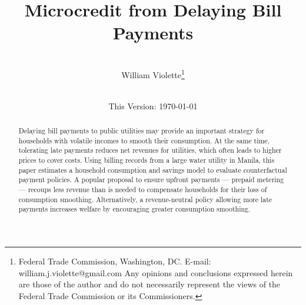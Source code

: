 \documentclass[12pt,table]{article}
\begin{document}
\begin{titlepage} 
\title{Microcredit from Delaying Bill Payments}
\author{\\[3em]
  William Violette\thanks{Federal Trade Commission, Washington, DC. E-mail: william.j.violette@gmail.com   Any opinions and conclusions expressed herein are those of the author and do not necessarily represent the views of the Federal Trade Commission or its Commissioners.} \\
 \\ 
  }
\vspace{30mm}
\date{\vspace{5mm}This Version: \today}
\maketitle
\begin{abstract}
Delaying bill payments to public utilities may provide an important strategy for households with volatile incomes to smooth their consumption.  At the same time, tolerating late payments reduces net revenues for utilities, which often leads to higher prices to cover costs.  Using billing records from a large water utility in Manila, this paper estimates a household consumption and savings model to evaluate counterfactual payment policies.  A popular proposal to ensure upfront payments --- prepaid metering --- recoups less revenue than is needed to compensate households for their loss of consumption smoothing.  Alternatively, a revenue-neutral policy allowing more late payments increases welfare by encouraging greater consumption smoothing.








\end{abstract}
\end{titlepage}
\end{document}
